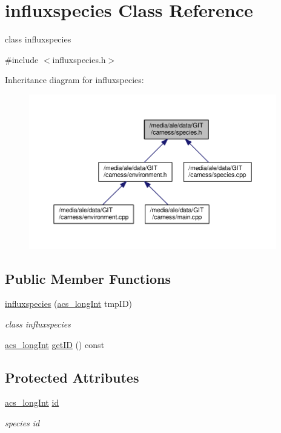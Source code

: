 \hypertarget{a00005}{\section{influxspecies Class Reference}
\label{a00005}
}


class influxspecies  




{\ttfamily \#include $<$influxspecies.\-h$>$}



Inheritance diagram for influxspecies\-:\nopagebreak
\begin{figure}[H]
\begin{center}
\leavevmode
\includegraphics[width=306pt]{a00081}
\end{center}
\end{figure}
\subsection*{Public Member Functions}
\begin{DoxyCompactItemize}
\item 
\hyperlink{a00005_ad387508561a2db60265edf167859f5bb}{influxspecies} (\hyperlink{a00016_a19319d75f02db4308bc5c0026d98cd85}{acs\-\_\-long\-Int} tmp\-I\-D)
\begin{DoxyCompactList}\small\item\em class influxspecies \end{DoxyCompactList}\item 
\hyperlink{a00016_a19319d75f02db4308bc5c0026d98cd85}{acs\-\_\-long\-Int} \hyperlink{a00005_ac619311c01699bbcc00a00961642a6f7}{get\-I\-D} () const 
\end{DoxyCompactItemize}
\subsection*{Protected Attributes}
\begin{DoxyCompactItemize}
\item 
\hyperlink{a00016_a19319d75f02db4308bc5c0026d98cd85}{acs\-\_\-long\-Int} \hyperlink{a00005_a5b4640f6e8c28dfdacd2bddb327d13f2}{id}
\begin{DoxyCompactList}\small\item\em species id \end{DoxyCompactList}\end{DoxyCompactItemize}


